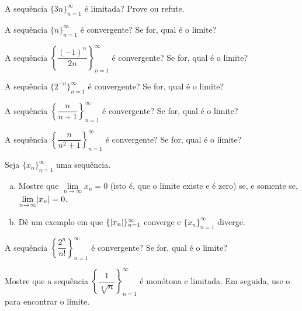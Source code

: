 \begin{exercise}
A sequência
$\{ 3n \}_{n=1}^\infty$
é limitada? Prove ou refute.
\end{exercise}

\begin{exercise}
A sequência
$\{ n \}_{n=1}^\infty$
é convergente? Se for, qual é o limite?
\end{exercise}

\begin{exercise}
A sequência
$\left\{ \dfrac{{(-1)}^n}{2n} \right\}_{n=1}^\infty$
é convergente? Se for, qual é o limite?
\end{exercise}

\begin{exercise}
A sequência
$\{ 2^{-n} \}_{n=1}^\infty$
é convergente? Se for, qual é o limite?
\end{exercise}

\begin{exercise}
A sequência
$\left\{ \dfrac{n}{n+1} \right\}_{n=1}^\infty$
é convergente? Se for, qual é o limite?
\end{exercise}

\begin{exercise}
A sequência
$\left\{ \dfrac{n}{n^2+1} \right\}_{n=1}^\infty$
é convergente? Se for, qual é o limite?
\end{exercise}

\begin{exercise} \label{exercise:absconv}
Seja $\{ x_n \}_{n=1}^\infty$ uma sequência.
\begin{enumerate}[a)]
\item Mostre que $\lim\limits_{n\to\infty} x_n = 0$ (isto é, que o limite
existe e é zero) se, e somente se, $\lim\limits_{n\to\infty} \lvert {x_n} \rvert = 0$.
\item Dê um exemplo em que $\{ \lvert {x_n} \rvert \}_{n=1}^\infty$ converge e
$\{ x_n \}_{n=1}^\infty$ diverge.
\end{enumerate}
\end{exercise}

\begin{exercise}
A sequência
$\left\{ \dfrac{2^n}{n!} \right\}_{n=1}^\infty$
é convergente? Se for, qual é o limite?
\end{exercise}

\begin{exercise}
Mostre que a sequência
$\left\{ \dfrac{1}{\sqrt[3]{n}} \right\}_{n=1}^\infty$ é monótona e limitada.
Em seguida, use o  para encontrar o limite.
\end{exercise}

